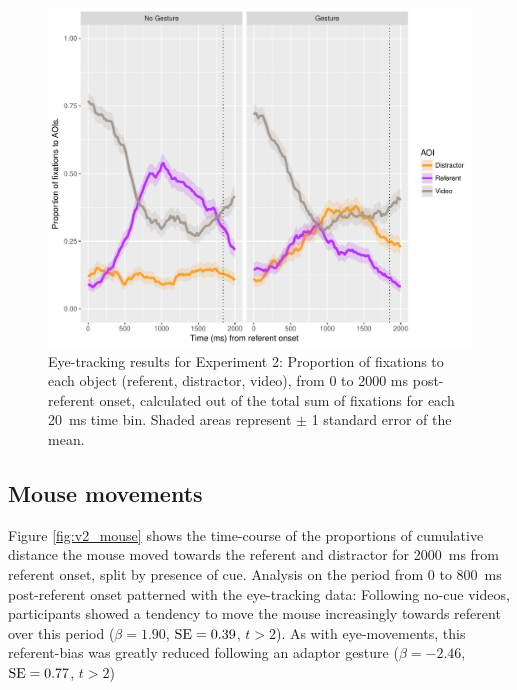 \documentclass[a4paper,man,natbib]{apa6}
\newcommand{\resultsLM}[3]{$\beta = #1$, $\textnormal{SE} = #2$, $t #3$}
\begin{document}
\begin{figure}[Ht]
  \centering
	\includegraphics[width=\linewidth]{./img/e8_fixations.pdf}
  \caption{Eye-tracking results for Experiment 2: Proportion of fixations to each object (referent, distractor, video), from 0 to 2000 ms post-referent onset, calculated out of the total sum of fixations for each 20~ms time bin. Shaded areas represent $\pm$ 1 standard error of the mean.}
  \label{fig:v2_eye}
\end{figure}

\subsection{Mouse movements}
Figure \ref{fig:v2_mouse} shows the time-course of the proportions of cumulative distance the mouse moved towards the referent and distractor for 2000~ms from referent onset, split by presence of cue.
Analysis on the period from 0 to 800~ms post-referent onset patterned with the eye-tracking data:
Following no-cue videos, participants showed a tendency to move the mouse increasingly towards referent over this period (\resultsLM{1.90}{0.39}{>2}).
As with eye-movements, this referent-bias was greatly reduced following an adaptor gesture (\resultsLM{-2.46}{0.77}{>2})
\end{document}
